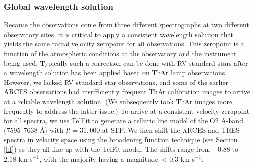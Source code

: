\subsubsection{Global wavelength solution}\label{wavelength}
Because the observations come from three different spectrographs at two different observatory sites, it is critical to apply a consistent wavelength solution that yields the same radial velocity zeropoint for all observations. This zeropoint is a function of the atmospheric conditions at the observatory and the instrument being used. Typically such a correction can be done with RV standard stars after a wavelength solution has been applied based on ThAr lamp observations. However, we lacked RV standard star observations, and some of the earlier ARCES observations had insufficiently frequent ThAr calibration images to arrive at a reliable wavelength solution. (We subsequently took ThAr images more frequently to address the latter issue.) To arrive at a consistent velocity zeropoint for all spectra, we use TelFit \citep{gul14} to generate a telluric line model of the O2 A-band (7595--7638 \AA) with $R = 31,000$ at STP. We then shift the ARCES and TRES spectra in velocity space using the broadening function technique (see Section \ref{bf}) so they all line up with the TelFit model. The shifts range from $-0.88$ to $2.18$ km s$^{-1}$, with the majority having a magnitude $< 0.3$ km s$^{-1}$.
  
  
  
  